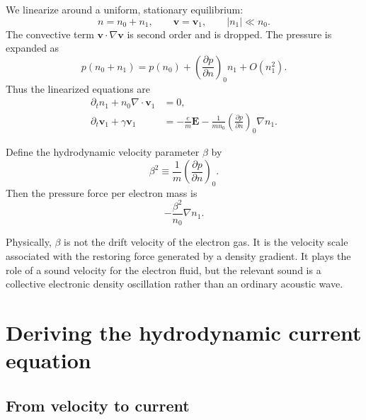 \documentclass[11pt,a4paper]{article}
\newcommand{\E}{\mathbf E}
\begin{document}
We linearize around a uniform, stationary equilibrium:
\begin{equation}
    n=n_0+n_1,
    \qquad
    \mathbf v=\mathbf v_1,
    \qquad
    |n_1|\ll n_0.
    \label{eq:linearization}
\end{equation}
The convective term \(\mathbf v\!\cdot\!\nabla\mathbf v\) is second order and
is dropped.  The pressure is expanded as
\begin{equation}
    p(n_0+n_1)=p(n_0)+
    \left(\frac{\partial p}{\partial n}\right)_0n_1+O(n_1^2).
    \label{eq:pressure-linearization}
\end{equation}
Thus the linearized equations are
\begin{align}
    \partial_t n_1+n_0\nabla\!\cdot\mathbf v_1&=0,
    \label{eq:linear-continuity}\\[2mm]
    \partial_t\mathbf v_1+\gamma\mathbf v_1
    &=-\frac{e}{m}\E
    -\frac{1}{m n_0}
      \left(\frac{\partial p}{\partial n}\right)_0
      \nabla n_1.
    \label{eq:linear-euler}
\end{align}

Define the hydrodynamic velocity parameter \(\beta\) by
\begin{equation}
    \boxed{
    \beta^2\equiv
    \frac{1}{m}\left(\frac{\partial p}{\partial n}\right)_0.
    }
    \label{eq:beta-thermodynamic}
\end{equation}
Then the pressure force per electron mass is
\begin{equation}
    -\frac{\beta^2}{n_0}\nabla n_1.
    \label{eq:pressure-force-beta}
\end{equation}

Physically, \(\beta\) is not the drift velocity of the electron gas.  It is
the velocity scale associated with the restoring force generated by a density
gradient.  It plays the role of a sound velocity for the electron fluid, but
the relevant sound is a collective electronic density oscillation rather
than an ordinary acoustic wave.

\section{Deriving the hydrodynamic current equation}

\subsection{From velocity to current}
\end{document}
